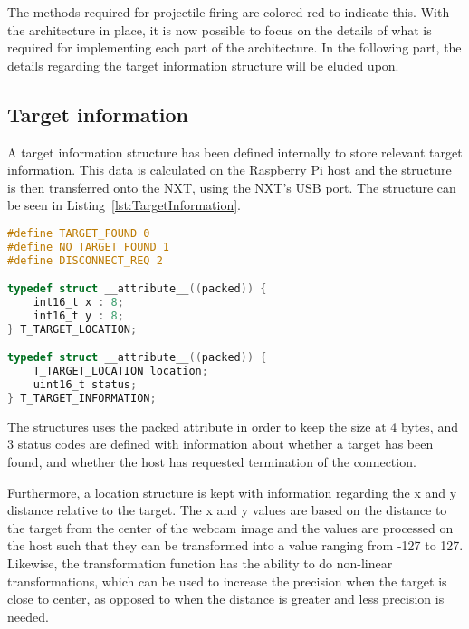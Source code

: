 The methods required for projectile firing are colored red to indicate this.
With the architecture in place, it is now possible to focus on the details of what is required for implementing each part of the architecture.
In the following part, the details regarding the target information structure will be eluded upon.

\subsection{Target information}
A target information structure has been defined internally to store relevant target information.
This data is calculated on the Raspberry Pi host and the structure is then transferred onto the NXT, using the NXT's USB port.
The structure can be seen in Listing~\ref{lst:TargetInformation}.
\begin{lstlisting}[language=C, label={lst:TargetInformation},caption={Target information structure from target\_location.h}]
#define TARGET_FOUND 0
#define NO_TARGET_FOUND 1
#define DISCONNECT_REQ 2

typedef struct __attribute__((packed)) {
	int16_t x : 8;
	int16_t y : 8;
} T_TARGET_LOCATION;

typedef struct __attribute__((packed)) {
	T_TARGET_LOCATION location;
	uint16_t status;
} T_TARGET_INFORMATION;
\end{lstlisting}

The structures uses the packed attribute in order to keep the size at 4 bytes, and 3 status codes are defined with information about whether a target has been found, and whether the host has requested termination of the connection.

Furthermore, a location structure is kept with information regarding the x and y distance relative to the target.
The x and y values are based on the distance to the target from the center of the webcam image and the values are processed on the host such that they can be transformed into a value ranging from -127 to 127.
Likewise, the transformation function has the ability to do non-linear transformations, which can be used to increase the precision when the target is close to center, as opposed to when the distance is greater and less precision is needed.
